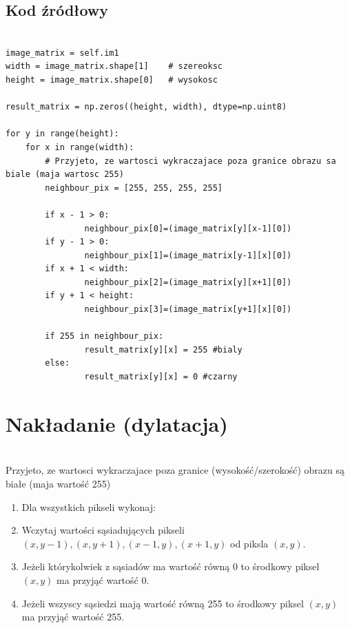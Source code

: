 \documentclass[final,a4paper,openany,12pt]{mwbk}
\begin{document}
\subsection*{Kod źródłowy}

\begin{lstlisting}[caption= Operacja okrawania (erozji) na obrazie binarnym]

image_matrix = self.im1
width = image_matrix.shape[1]    # szereoksc
height = image_matrix.shape[0]   # wysokosc

result_matrix = np.zeros((height, width), dtype=np.uint8)

for y in range(height):
    for x in range(width):  
        # Przyjeto, ze wartosci wykraczajace poza granice obrazu sa biale (maja wartosc 255)
        neighbour_pix = [255, 255, 255, 255]

        if x - 1 > 0:
                neighbour_pix[0]=(image_matrix[y][x-1][0])
        if y - 1 > 0:
                neighbour_pix[1]=(image_matrix[y-1][x][0])
        if x + 1 < width:
                neighbour_pix[2]=(image_matrix[y][x+1][0])
        if y + 1 < height:
                neighbour_pix[3]=(image_matrix[y+1][x][0])

        if 255 in neighbour_pix:
                result_matrix[y][x] = 255 #bialy
        else:
                result_matrix[y][x] = 0 #czarny   

\end{lstlisting}

\section{ Nakładanie (dylatacja)}
\hfill\\
\indent
       Przyjeto, ze wartosci wykraczajace poza granice (wysokość/szerokość) obrazu są białe (maja wartość 255)\\
	\begin{enumerate}	
		\item Dla wszystkich pikseli wykonaj:
		\item Wczytaj wartości sąsiadujących pikseli $(x,y-1),(x,y+1),(x-1,y),(x+1,y)$ od piksla $(x,y)$.
		\item Jeżeli którykolwiek z sąsiadów ma wartość równą 0 to środkowy piksel $(x,y)$ ma przyjąć wartość 0. 
		\item Jeżeli wszyscy sąsiedzi mają wartość równą 255 to środkowy piksel $(x,y)$ ma przyjąć wartość 255.
	\end{enumerate}
\end{document}
